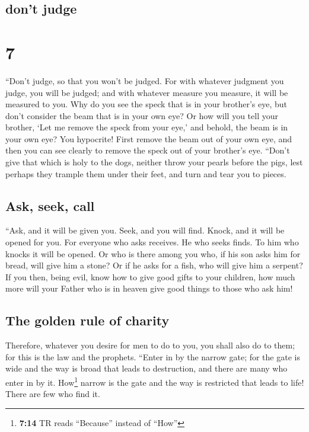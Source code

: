 \hypertarget{dont-judge}{%
\subsection{don't judge}\label{dont-judge}}

\hypertarget{section-6}{%
\section{7}\label{section-6}}

 ``Don't judge, so that you won't be judged.
 For with whatever judgment you judge, you will be judged;
and with whatever measure you measure, it will be measured to you.
 Why do you see the speck that is in your brother's eye,
but don't consider the beam that is in your own eye?  Or
how will you tell your brother, `Let me remove the speck from your eye,'
and behold, the beam is in your own eye?  You hypocrite!
First remove the beam out of your own eye, and then you can see clearly
to remove the speck out of your brother's eye.  ``Don't
give that which is holy to the dogs, neither throw your pearls before
the pigs, lest perhaps they trample them under their feet, and turn and
tear you to pieces.

\hypertarget{ask-seek-call}{%
\subsection{Ask, seek, call}\label{ask-seek-call}}

 ``Ask, and it will be given you. Seek, and you will find.
Knock, and it will be opened for you.  For everyone who
asks receives. He who seeks finds. To him who knocks it will be opened.
 Or who is there among you who, if his son asks him for
bread, will give him a stone?  Or if he asks for a fish,
who will give him a serpent?  If you then, being evil,
know how to give good gifts to your children, how much more will your
Father who is in heaven give good things to those who ask him!

\hypertarget{the-golden-rule-of-charity}{%
\subsection{The golden rule of
charity}\label{the-golden-rule-of-charity}}

 Therefore, whatever you desire for men to do to you, you
shall also do to them; for this is the law and the prophets.
 ``Enter in by the narrow gate; for the gate is wide and
the way is broad that leads to destruction, and there are many who enter
in by it.  How\footnote{\textbf{7:14} TR reads
  ``Because'' instead of ``How''} narrow is the gate and the way is
restricted that leads to life! There are few who find it.

